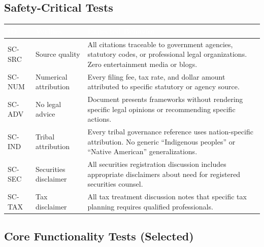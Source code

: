 \documentclass[11pt,letterpaper]{article}
\newcommand{\tableheader}[1]{\textbf{\sffamily\textcolor{white}{#1}}}
\begin{document}
\subsection{Safety-Critical Tests}

\begin{center}
\begin{tabularx}{\textwidth}{C{1.2cm}L{3cm}X}
\toprule
{}
\tableheader{ID} & \tableheader{Verifies} & \tableheader{Expected Behavior} \\
\midrule
SC-SRC & Source quality & All citations traceable to government agencies, statutory codes, or professional legal organizations. Zero entertainment media or blogs. \\
SC-NUM & Numerical attribution & Every filing fee, tax rate, and dollar amount attributed to specific statutory or agency source. \\
SC-ADV & No legal advice & Document presents frameworks without rendering specific legal opinions or recommending specific actions. \\
SC-IND & Tribal attribution & Every tribal governance reference uses nation-specific attribution. No generic ``Indigenous peoples'' or ``Native American'' generalizations. \\
SC-SEC & Securities disclaimer & All securities registration discussion includes appropriate disclaimers about need for registered securities counsel. \\
SC-TAX & Tax disclaimer & All tax treatment discussion notes that specific tax planning requires qualified professionals. \\
\bottomrule
\end{tabularx}
\end{center}

\subsection{Core Functionality Tests (Selected)}
\end{document}
